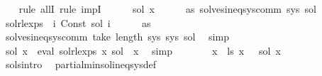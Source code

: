 \begin{isabellebody}
\ \ \isamarkupfalse%
\ {\isacharparenleft}{\kern0pt}rule\ allI{\isacharcomma}{\kern0pt}\ rule\ impI{\isacharparenright}{\kern0pt}\isanewline
\ \ \ \ \isamarkupfalse%
\ sol{\isacharprime}{\kern0pt}\ x\isanewline
\ \ \ \ \isamarkupfalse%
\ as{\isacharcolon}{\kern0pt}\ {\isachardoublequoteopen}solves{\isacharunderscore}{\kern0pt}ineq{\isacharunderscore}{\kern0pt}sys{\isacharunderscore}{\kern0pt}comm\ sys\ sol{\isacharprime}{\kern0pt}{\isachardoublequoteclose}\isanewline
\ \ \ \ \isamarkupfalse%
\ {\isacharquery}{\kern0pt}sol{\isacharunderscore}{\kern0pt}rlexps\ {\isacharequal}{\kern0pt}\ {\isachardoublequoteopen}{\isasymlambda}i{\isachardot}{\kern0pt}\ Const\ {\isacharparenleft}{\kern0pt}sol{\isacharprime}{\kern0pt}\ i{\isacharparenright}{\kern0pt}{\isachardoublequoteclose}\isanewline
\ \ \ \ \isamarkupfalse%
\ as\ \isamarkupfalse%
\ {\isachardoublequoteopen}solves{\isacharunderscore}{\kern0pt}ineq{\isacharunderscore}{\kern0pt}sys{\isacharunderscore}{\kern0pt}comm\ {\isacharparenleft}{\kern0pt}take\ {\isacharparenleft}{\kern0pt}length\ sys{\isacharparenright}{\kern0pt}\ sys{\isacharparenright}{\kern0pt}\ sol{\isacharprime}{\kern0pt}{\isachardoublequoteclose}\ \isamarkupfalse%
\ simp\isanewline
\ \ \ \ \isamarkupfalse%
\ \isamarkupfalse%
\ {\isachardoublequoteopen}sol{\isacharprime}{\kern0pt}\ x\ {\isacharequal}{\kern0pt}\ eval\ {\isacharparenleft}{\kern0pt}{\isacharquery}{\kern0pt}sol{\isacharunderscore}{\kern0pt}rlexps\ x{\isacharparenright}{\kern0pt}\ sol{\isacharprime}{\kern0pt}{\isachardoublequoteclose}\ \ x\ \isamarkupfalse%
\ simp\isanewline
\ \ \ \ \isamarkupfalse%
\ \isamarkupfalse%
\ {\isachardoublequoteopen}{\isasymforall}x{\isachardot}{\kern0pt}\ {\isasymPsi}\ {\isacharparenleft}{\kern0pt}{\isacharquery}{\kern0pt}ls{\isacharprime}{\kern0pt}\ x{\isacharparenright}{\kern0pt}\ {\isasymsubseteq}\ {\isasymPsi}\ {\isacharparenleft}{\kern0pt}sol{\isacharprime}{\kern0pt}\ x{\isacharparenright}{\kern0pt}{\isachardoublequoteclose}\isanewline
\ \ \ \ \ \ \isamarkupfalse%
\ sols{\isacharunderscore}{\kern0pt}intro\ \isamarkupfalse%
\ partial{\isacharunderscore}{\kern0pt}min{\isacharunderscore}{\kern0pt}sol{\isacharunderscore}{\kern0pt}ineq{\isacharunderscore}{\kern0pt}sys{\isacharunderscore}{\kern0pt}def\isanewline
\ \ \ \ \ \ \isamarkupfalse%

\end{isabellebody}
